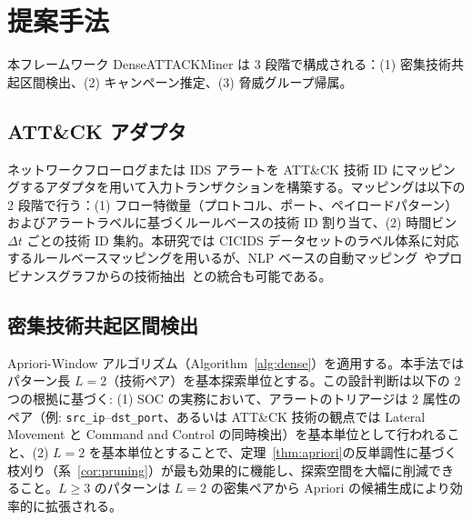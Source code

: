 \documentclass[11pt]{article}
\begin{document}
\section{提案手法}\label{sec:method}

本フレームワーク DenseATTACKMiner は 3 段階で構成される：(1) 密集技術共起区間検出、(2) キャンペーン推定、(3) 脅威グループ帰属。

\subsection{ATT\&CK アダプタ}\label{sec:adapter}

ネットワークフローログまたは IDS アラートを ATT\&CK 技術 ID にマッピングするアダプタを用いて入力トランザクションを構築する。マッピングは以下の 2 段階で行う：(1) フロー特徴量（プロトコル、ポート、ペイロードパターン）およびアラートラベルに基づくルールベースの技術 ID 割り当て、(2) 時間ビン $\Delta t$ ごとの技術 ID 集約。本研究では CICIDS データセットのラベル体系に対応するルールベースマッピングを用いるが、NLP ベースの自動マッピング~\cite{legoy2020automated}やプロビナンスグラフからの技術抽出~\cite{alsaheel2021atlas}との統合も可能である。

\subsection{密集技術共起区間検出}

Apriori-Window アルゴリズム（Algorithm~\ref{alg:dense}）を適用する。本手法ではパターン長 $L=2$（技術ペア）を基本探索単位とする。この設計判断は以下の 2 つの根拠に基づく: (1) SOC の実務において、アラートのトリアージは 2 属性のペア（例: \texttt{src\_ip}--\texttt{dst\_port}、あるいは ATT\&CK 技術の観点では Lateral Movement と Command and Control の同時検出）を基本単位として行われること、(2) $L=2$ を基本単位とすることで、定理~\ref{thm:apriori}の反単調性に基づく枝刈り（系~\ref{cor:pruning}）が最も効果的に機能し、探索空間を大幅に削減できること。$L \geq 3$ のパターンは $L=2$ の密集ペアから Apriori の候補生成により効率的に拡張される。
\end{document}
